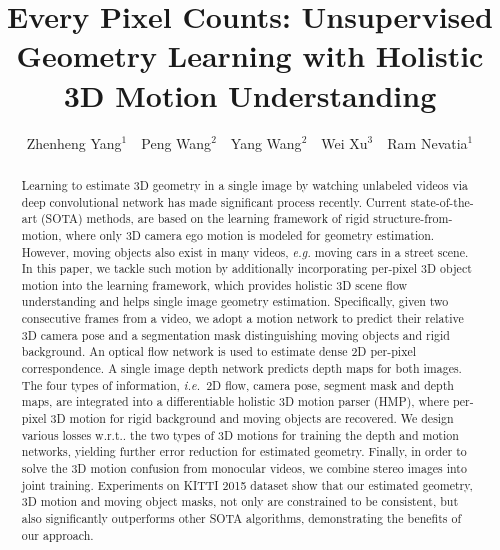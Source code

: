 \documentclass[runningheads]{llncs}
\makeatletter
\DeclareRobustCommand\onedot{\futurelet\@let@token\@onedot}
\def\onedot{\ifx\@let@token.\else.\null\fi\xspace}
\def\ie{\emph{i.e.}}
\def\wrt{w.r.t\onedot}
\makeatother
\begin{document}
\pagestyle{headings}
\mainmatter

\title{Every Pixel Counts: Unsupervised Geometry Learning with Holistic 3D Motion Understanding} 

\author{
Zhenheng Yang$^{1}$~~Peng Wang$^{2}$~~Yang Wang$^{2}$~~Wei Xu$^{3}$~~Ram Nevatia$^{1}$\\
}


\maketitle


\begin{abstract}
    Learning to estimate 3D geometry in a single image by watching unlabeled videos via deep convolutional network has made significant process recently. Current state-of-the-art (SOTA) methods, are based on the learning framework of rigid structure-from-motion, where only 3D camera ego motion is modeled for geometry estimation. 
    However, moving objects also exist in many videos, \textit{e.g.} moving cars in a street scene.
    In this paper, we tackle such motion by additionally incorporating per-pixel 3D object motion into the learning framework, which provides holistic 3D scene flow understanding and helps single image geometry estimation. 
    Specifically, given two consecutive frames from a video, we adopt a motion network to predict their relative 3D camera pose and a segmentation mask distinguishing moving objects and rigid background. An optical flow network is used to estimate dense 2D per-pixel correspondence. A single image depth network predicts depth maps for both images. 
    The four types of information,  \ie~2D flow, camera pose, segment mask and depth maps, are integrated into a differentiable holistic 3D motion parser (HMP), where per-pixel 3D motion for rigid background and moving objects are recovered. We design various losses \wrt the two types of 3D motions for training the depth and motion networks, yielding further error reduction for estimated geometry.
Finally, in order to solve the 3D motion confusion from monocular videos, we combine stereo images into joint training.
    Experiments on KITTI 2015 dataset show that our estimated geometry, 3D motion and moving object masks, not only are constrained to be consistent, but also significantly outperforms other SOTA algorithms, demonstrating the benefits of our approach.



   
\end{abstract}
\end{document}
